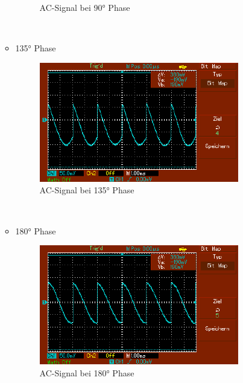 \documentclass[captions=tableheading]{scrartcl}
\begin{document}
\begin{itemize}
\begin{itemize}
\begin{figure}
                \caption{AC-Signal bei 90° Phase}
                \label{fig:90sig}
            \end{figure}
            \\
            \newpage
            \item{135° Phase}
            \begin{figure}
                \centering
                \includegraphics{Lock_In Bilder/Aufgabe 3/MAP004.pdf}
                \caption{AC-Signal bei 135° Phase}
                \label{fig:135sig}
            \end{figure}
            \\
            \item{180° Phase}
            \begin{figure}
                \centering
                \includegraphics{Lock_In Bilder/Aufgabe 3/MAP005.pdf}
                \caption{AC-Signal bei 180° Phase}
                \label{fig:180sig}
            \end{figure}
            \\
            \end{itemize}
    \end{itemize}
\end{document}
